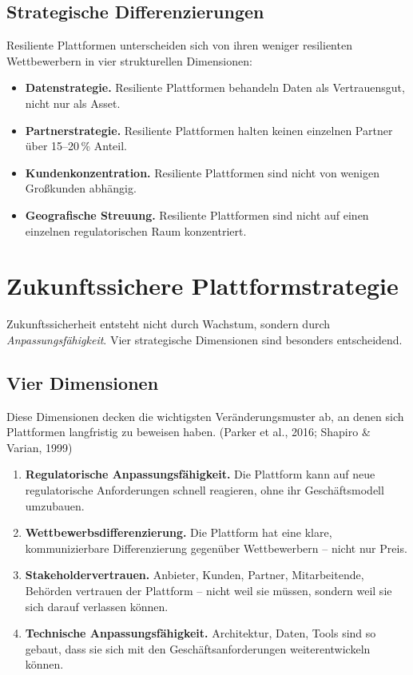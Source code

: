 \documentclass[11pt,a4paper,oneside]{article}
\newcommand{\fachbegriff}[1]{\textbf{#1}}
\newcommand{\quelle}[1]{{\footnotesize\color{lpGray}(#1)}}
\begin{document}
\subsection{Strategische Differenzierungen}

Resiliente Plattformen unterscheiden sich von ihren weniger resilienten Wettbewerbern in vier strukturellen Dimensionen:

\begin{itemize}
  \item \textbf{Datenstrategie.} Resiliente Plattformen behandeln Daten als Vertrauensgut, nicht nur als Asset.
  \item \textbf{Partnerstrategie.} Resiliente Plattformen halten keinen einzelnen Partner über 15--20\,\% Anteil.
  \item \textbf{Kundenkonzentration.} Resiliente Plattformen sind nicht von wenigen Großkunden abhängig.
  \item \textbf{Geografische Streuung.} Resiliente Plattformen sind nicht auf einen einzelnen regulatorischen Raum konzentriert.
\end{itemize}

\section{Zukunftssichere Plattformstrategie}

Zukunftssicherheit entsteht nicht durch Wachstum, sondern durch \emph{Anpassungsfähigkeit}. Vier strategische Dimensionen sind besonders entscheidend.

\subsection{Vier Dimensionen}

Diese Dimensionen decken die wichtigsten Veränderungsmuster ab, an denen sich Plattformen langfristig zu beweisen haben. \quelle{Parker et al., 2016; Shapiro \& Varian, 1999}

\begin{enumerate}
  \item \fachbegriff{Regulatorische Anpassungsfähigkeit.} Die Plattform kann auf neue regulatorische Anforderungen schnell reagieren, ohne ihr Geschäftsmodell umzubauen.
  \item \fachbegriff{Wettbewerbsdifferenzierung.} Die Plattform hat eine klare, kommunizierbare Differenzierung gegenüber Wettbewerbern -- nicht nur Preis.
  \item \fachbegriff{Stakeholdervertrauen.} Anbieter, Kunden, Partner, Mitarbeitende, Behörden vertrauen der Plattform -- nicht weil sie müssen, sondern weil sie sich darauf verlassen können.
  \item \fachbegriff{Technische Anpassungsfähigkeit.} Architektur, Daten, Tools sind so gebaut, dass sie sich mit den Geschäftsanforderungen weiterentwickeln können.
\end{enumerate}
\end{document}
